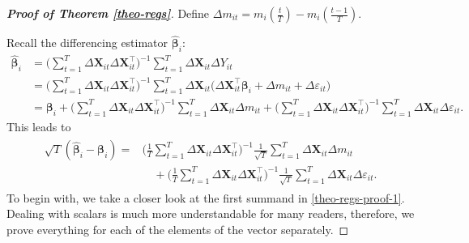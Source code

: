 \documentclass[a4paper,12pt]{article}
\begin{document}
\begin{proof}[\textnormal{\textbf{Proof of Theorem \ref{theo-regs}}}]
Define $\Delta m_{it} = m_i \left( \frac{t}{T} \right) - m_i \left(\frac{t-1}{T}\right)$.

Recall the differencing estimator $\widehat{\bm{\beta}}_i$:
\begin{align*}
\widehat{\bm{\beta}}_i &= \Big( \sum_{t=1}^T \Delta \mathbf{X}_{it} \Delta \mathbf{X}_{it}^\top \Big)^{-1} \sum_{t=1}^T \Delta \mathbf{X}_{it} \Delta Y_{it} \\
& =  \Big( \sum_{t=1}^T \Delta \mathbf{X}_{it} \Delta \mathbf{X}_{it}^\top \Big)^{-1} \sum_{t=1}^T \Delta \mathbf{X}_{it} \bigg(\Delta \mathbf{X}_{it}^\top \bm{\beta}_i +  \Delta m_{it}+ \Delta \varepsilon_{it} \bigg) \\
&= \bm{\beta}_i +   \Big( \sum_{t=1}^T \Delta \mathbf{X}_{it} \Delta \mathbf{X}_{it}^\top \Big)^{-1} \sum_{t=1}^T \Delta \mathbf{X}_{it} \Delta m_{it} +  \Big( \sum_{t=1}^T \Delta \mathbf{X}_{it} \Delta \mathbf{X}_{it}^\top \Big)^{-1} \sum_{t=1}^T \Delta \mathbf{X}_{it} \Delta \varepsilon_{it}. 
\end{align*}
This leads to
\begin{align}\label{theo-regs-proof-1}
\begin{split}
 \sqrt{T}( \widehat{\bm{\beta}}_i - \bm{\beta}_i) = &\Big( \frac{1}{T}\sum_{t=1}^T \Delta \mathbf{X}_{it} \Delta \mathbf{X}_{it}^\top \Big)^{-1} \frac{1}{\sqrt{T}}\sum_{t=1}^T \Delta \mathbf{X}_{it} \Delta m_{it} \\
&\quad+  \Big(\frac{1}{T} \sum_{t=1}^T \Delta \mathbf{X}_{it} \Delta \mathbf{X}_{it}^\top \Big)^{-1}\frac{1}{\sqrt{T}} \sum_{t=1}^T \Delta \mathbf{X}_{it} \Delta \varepsilon_{it}.
\end{split}
\end{align}
To begin with, we take a closer look at the first summand in \eqref{theo-regs-proof-1}. Dealing with scalars is much more understandable for many readers, therefore, we  prove everything for each of the elements of the vector separately.


\end{proof}
\end{document}
